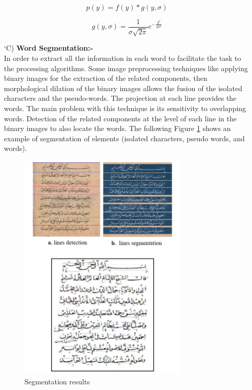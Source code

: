 \begin{itemize}[labelindent=1em,labelsep=0.25cm,leftmargin=*]
        \begin{equation}
            p(y) = f(y)*g(y,\sigma) 
        \label{equ:gaussian-filter}
        \end{equation}
        
        \begin{equation}
            g(y, \sigma) = \frac{1}{\sigma \sqrt{2 \pi}} e^{-\frac{y^2}{2\sigma^2}}
        \label{equ:signal-function}
        \end{equation}
        
        \item[\char `C)] \textbf{Word Segmentation:-} \\
        In order to extract all the information in each word to facilitate the task to the processing algorithms. Some image preprocessing techniques like applying binary images for the extraction of the related components, then morphological dilation of the binary images allows the fusion of the isolated characters and the pseudo-words. The projection at each line provides the words. The main problem with this technique is its sensitivity to overlapping words. Detection of the related components at the level of each line in the binary images to also locate the words.
        The following Figure \ref{fig:noureddine-word-line} shows an example of segmentation of elements (isolated characters, pseudo words, and words).
        
        \begin{figure}[!htb]
            \centering
            \includegraphics[width=8cm]{images/noureddine-line-word-segmentation.png}
            \caption{Segmentation results}
            \label{fig:noureddine-word-line}
        \end{figure}
        

\end{itemize}
